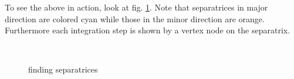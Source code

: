 \documentclass[a4paper,10pt,notitlepage]{scrreprt}
\begin{document}
To see the above in action, look at fig. \ref{fig:separatrices}. Note that
separatrices in major direction are colored cyan while those in the minor
direction are orange. Furthermore each integration step is shown by a vertex
node on the separatrix.

\begin{figure}
  \centering
  \\
  \caption{finding separatrices}
  \label{fig:separatrices}
\end{figure}
\end{document}
